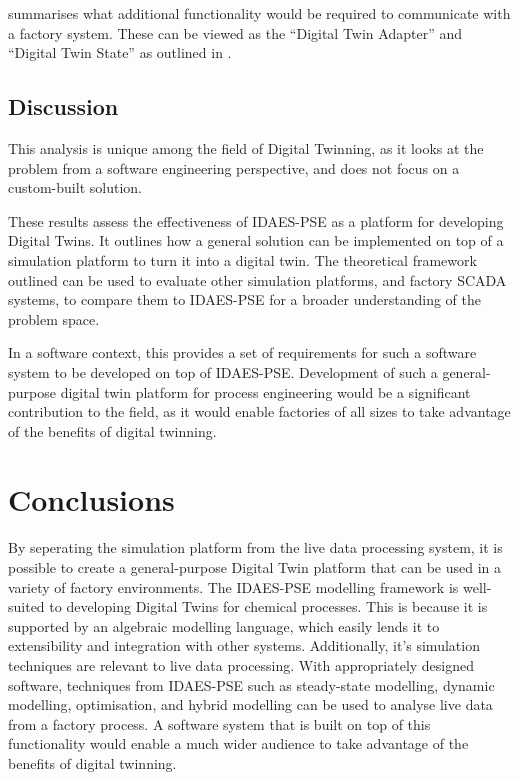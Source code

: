 \documentclass[12pt]{article}
\begin{document}
 summarises what additional functionality would be required to communicate with a factory system. These can be viewed as the ``Digital Twin Adapter'' and ``Digital Twin State'' as outlined in .


\subsection{Discussion}

This analysis is unique among the field of Digital Twinning, as it looks at the problem from a software engineering perspective, and does not focus on a custom-built solution.

These results assess the effectiveness of IDAES-PSE as a platform for developing Digital Twins. 
It outlines how a general solution can be implemented on top of a simulation platform to turn it into a digital twin. 
The theoretical framework outlined can be used to evaluate other simulation platforms, and factory SCADA systems, to compare them to IDAES-PSE for a broader understanding of the problem space.

In a software context, this provides a set of requirements for such a software system to be developed on top of IDAES-PSE.
Development of such a general-purpose digital twin platform for process engineering would be a significant contribution to the field, as it would enable factories of all sizes to take advantage of the benefits of digital twinning.


\section{Conclusions}

By seperating the simulation platform from the live data processing system, it is possible to create a general-purpose Digital Twin platform that can be used in a variety of factory environments.
The IDAES-PSE modelling framework is well-suited to developing Digital Twins for chemical processes. 
This is because it is supported by an algebraic modelling language, which easily lends it to extensibility and integration with other systems. Additionally, it's simulation techniques are relevant to live data processing.
With appropriately designed software, techniques from IDAES-PSE such as steady-state modelling, dynamic modelling, optimisation, and hybrid modelling can be used to analyse live data from a factory process. 
A software system that is built on top of this functionality would enable a much wider audience to take advantage of the benefits of digital twinning. 
\end{document}
